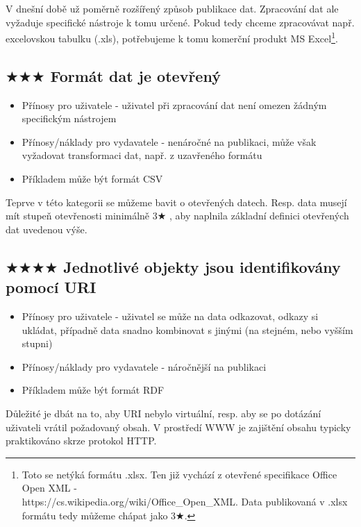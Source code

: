 V dnešní době už poměrně rozšířený způsob publikace dat. Zpracování dat ale vyžaduje specifické nástroje k tomu určené. Pokud tedy chceme zpracovávat např. excelovskou tabulku (.xls), potřebujeme k tomu komerční produkt MS Excel\footnote{Toto se netýká formátu .xlsx. Ten již vychází z otevřené specifikace Office Open XML - \\https://cs.wikipedia.org/wiki/Office\_Open\_XML. Data publikovaná v .xlsx formátu tedy můžeme chápat jako 3$\bigstar$.}. 

\subsection*{$\bigstar\bigstar\bigstar$ Formát dat je otevřený}

\medskip

\begin{itemize}
\item Přínosy pro uživatele - uživatel při zpracování dat není omezen žádným specifickým nástrojem
\item Přínosy/náklady pro vydavatele - nenáročné na publikaci, může však vyžadovat transformaci dat, např. z uzavřeného formátu
\item Příkladem může být formát CSV
\end{itemize}

Teprve v této kategorii se můžeme bavit o  otevřených datech. Resp. data musejí mít stupeň otevřenosti minimálně 3$\bigstar$ , aby naplnila základní definici otevřených dat uvedenou výše.

\subsection*{$\bigstar\bigstar\bigstar\bigstar$ Jednotlivé objekty jsou identifikovány pomocí URI}

\medskip

\begin{itemize}
\item Přínosy pro uživatele - uživatel se může na data odkazovat, odkazy si ukládat, případně data snadno kombinovat s jinými (na stejném, nebo vyšším stupni)
\item Přínosy/náklady pro vydavatele - náročnější na publikaci
\item Příkladem může být formát RDF
\end{itemize}

Důležité je dbát na to, aby URI nebylo virtuální, resp. aby se po dotázání uživateli vrátil požadovaný obsah. V prostředí WWW je zajištění obsahu typicky praktikováno skrze protokol HTTP. 

